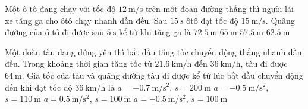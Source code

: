 \begin{ex}
	Một ô tô đang chạy với tốc độ $\SI{12}{\meter/\second}$ trên một đoạn đường thẳng thì người lái xe tăng
	ga cho ôtô chạy nhanh dần đều. Sau $\SI{15}{\second}$ ôtô đạt tốc độ $\SI{15}{\meter/\second}$. Quãng đường của ô tô
	đi được sau $\SI{5}{\second}$ kể từ khi tăng ga là	
	\choice
	{$\SI{72.5}{\meter}$}
	{$\SI{65}{\meter}$}
	{$\SI{57.5}{\meter}$}
	{\True $\SI{62.5}{\meter}$}
	\loigiai{}
\end{ex}
\begin{ex}
	Một đoàn tàu đang đứng yên  thì bắt đầu tăng tốc chuyển động thẳng nhanh dần đều. Trong khoảng thời gian tăng tốc từ $\SI{21.6}{\kilo\meter/\hour}$ đến $\SI{36}{\kilo\meter/\hour}$, tàu đi được $\SI{64}{\meter}$. Gia tốc của tàu và quãng đường tàu đi được kể từ lúc bắt đầu chuyển động đến khi đạt tốc độ $\SI{36}{\kilo\meter/\hour}$ là
	\choice
	{$a=\SI{-0.7}{\meter/\second^2}$, $s=\SI{200}{\meter}$}
	{$a=\SI{-0.5}{\meter/\second^2}$, $s=\SI{110}{\meter}$}
	{\True $a=\SI{0.5}{\meter/\second^2}$, $s=\SI{100}{\meter}$}
	{$a=\SI{-0.5}{\meter/\second^2}$, $s=\SI{100}{\meter}$}
	\loigiai{}
\end{ex}

